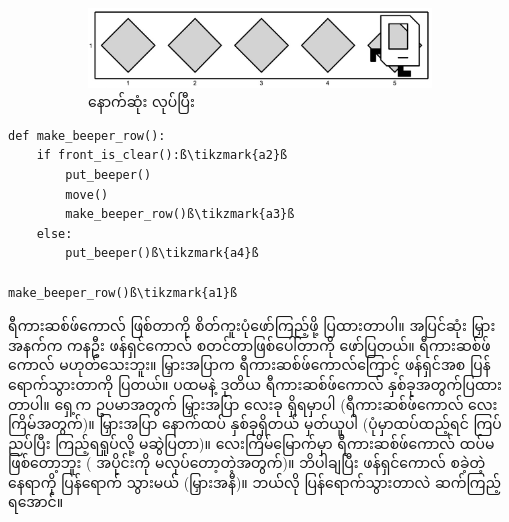 \begin{figure}[thb!]
    \begin{subfigure}[t]{{\figpctw}\textwidth}
        \includegraphics[scale=0.15]{images/ch04/mrofb/after.jpg}
        \caption{နောက်ဆုံး  လုပ်ပြီး}    
        \label{fig:mrofb_recur6}
    \end{subfigure}
    \caption{}
    \label{fig:mrofb_recur}
\end{figure}


%
\setlength{\fboxsep}{0pt}
\begin{verbatim}
def make_beeper_row():
    if front_is_clear():ß\tikzmark{a2}ß
        put_beeper()
        move()
        make_beeper_row()ß\tikzmark{a3}ß
    else:
        put_beeper()ß\tikzmark{a4}ß

make_beeper_row()ß\tikzmark{a1}ß
\end{verbatim}
%
%
\btwntikzannoandpar

ရီကားဆစ်ဖ်ကောလ် ဖြစ်တာကို စိတ်ကူးပုံဖော်ကြည့်ဖို့ ပြထားတာပါ။ အပြင်ဆုံး မြှားအနက်က ကန\allowbreak ဦး ဖန်ရှင်ကောလ် စတင်တာဖြစ်‌ပေါ်တာကို ဖော်ပြတယ်။ ရီကားဆစ်ဖ်ကောလ် မဟုတ်သေးဘူး။ မြှားအပြာက ရီကားဆစ်ဖ်ကောလ်ကြောင့် ဖန်ရှင်အစ ပြန်ရောက်သွားတာကို ပြတယ်။ ပထမနဲ့ ဒုတိယ ရီကားဆစ်ဖ်ကောလ် နှစ်ခုအတွက်ပြထားတာပါ။ ရှေ့က ဥပမာအတွက် မြှားအပြာ လေးခု ရှိရမှာပါ (ရီကားဆစ်ဖ်ကောလ် လေးကြိမ်အတွက်)။  မြှားအပြာ နောက်ထပ် နှစ်ခုရှိတယ် မှတ်ယူပါ (ပုံမှာထပ်ထည့်ရင် ကြပ်ညပ်ပြီး ကြည့်ရရှုပ်လို့ မဆွဲပြတာ)။ လေးကြိမ်မြောက်မှာ ရီကားဆစ်ဖ်ကောလ် ထပ်မဖြစ်တော့ဘူး ( အပိုင်းကို မလုပ်တော့တဲ့အတွက်)။ ဘိပါချပြီး ဖန်ရှင်ကောလ် စခဲ့တဲ့နေရာကို ပြန်ရောက် သွားမယ် (မြှားအနီ)။ ဘယ်လို ပြန်ရောက်သွားတာလဲ ဆက်ကြည့်ရအောင်။

